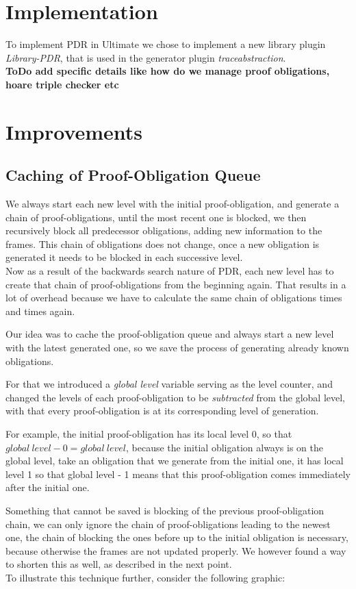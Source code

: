 \documentclass[11pt, a4paper, BCOR=10mm, ngerman, oneside]{scrbook}
\begin{document}
\section{Implementation}
To implement PDR in Ultimate we chose to implement a new library plugin \textsl{Library-PDR}, that is used in the generator plugin \textsl{traceabstraction}. \\
\textbf{ToDo add specific details like how do we manage proof obligations, hoare triple checker etc}

\section{Improvements}
\subsection{Caching of Proof-Obligation Queue}
We always start each new level with the initial proof-obligation, and generate a chain of proof-obligations, until the most recent one is blocked, we then recursively block all predecessor obligations, adding new information to the frames. This chain of obligations does not change, once a new obligation is generated it needs to be blocked in each successive level.\\
Now as a result of the backwards search nature of PDR, each new level has to create that chain of proof-obligations from the beginning again. That results in a lot of overhead because we have to calculate the same chain of obligations times and times again. \par
Our idea was to cache the proof-obligation queue and always start a new level with the latest generated one, so we save the process of generating already known obligations. \par For that we introduced a \textsl{global level} variable serving as the level counter, and changed the levels of each proof-obligation to be \textsl{subtracted} from the global level, with that every proof-obligation is at its corresponding level of generation. \par For example, the initial proof-obligation has its local level 0, so that $global\ level - 0 = global\ level$, because the initial obligation always is on the global level, take an obligation that we generate from the initial one, it has local level 1 so that global level - 1 means that this proof-obligation comes immediately after the initial one. \par
Something that cannot be saved is blocking of the previous proof-obligation chain, we can only ignore the chain of proof-obligations leading to the newest one, the chain of blocking the ones before up to the initial obligation is necessary, because otherwise the frames are not updated properly. We however found a way to shorten this as well, as described in the next point. \\ 
To illustrate this technique further, consider the following graphic: \\
\end{document}

